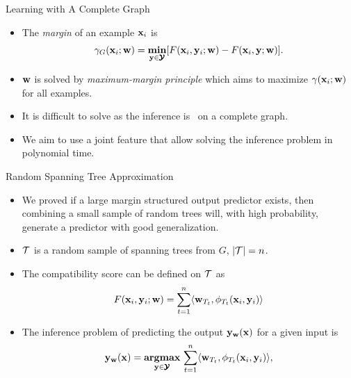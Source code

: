 \documentclass[first=dgreen,second=purple,logo=yellowexc]{aaltoslides}
\begin{document}
%
\begin{frame}{Learning with A Complete Graph}
	\begin{itemize}
		\item The \textit{margin} of an example $\mathbf {x}_i$ is
		\begin{align*}
			\gamma_G(\mathbf {x}_i;\mathbf {w}) = \underset{\mathbf {y}\in\pmb {\mathcal{Y}}}{\textbf{min}}[F(\mathbf {x}_i,\mathbf {y}_i;\mathbf {w})-F(\mathbf {x}_i,\mathbf {y};\mathbf {w})].
		\end{align*}
		\item $\mathbf {w}$ is solved by \textit{maximum-margin principle} which aims to maximize $\gamma(\mathbf {x}_i;\mathbf {w})$ for all examples.
		\item It is difficult to solve as the inference is \nphard\ on a complete graph.
		\item We aim to use a joint feature that allow solving the inference problem in polynomial time.
	\end{itemize}
\end{frame}



%
\begin{frame}{Random Spanning Tree Approximation}
	\begin{itemize}
		\item We proved if a large margin structured output predictor exists, then combining a small sample of random trees will, with high probability, generate a predictor with good generalization.
		\item $\mathcal{T}$ is a random sample of spanning trees from $G$, $|\mathcal{T}| = n$.
		\item The compatibility score can be defined on $\mathcal{T}$ as
		\begin{align*}
			F(\mathbf {x}_i,\mathbf {y}_i;\mathbf {w}) = \sum_{t=1}^{n}\langle \mathbf {w}_{T_t}, \phi_{T_t}(\mathbf {x}_i,\mathbf {y}_i) \rangle
		\end{align*}
		\item The inference problem of predicting the output $\mathbf {y}_{\mathbf {w}}(\mathbf {x})$ for a given input is 
		\begin{align*}
			\mathbf {y}_{\mathbf {w}}(\mathbf {x}) = \underset{\mathbf {y}\in\pmb {\mathcal{Y}}}{\textbf{argmax}}\,\sum_{t=1}^{n}\langle \mathbf {w}_{T_t}, \phi_{T_t}(\mathbf {x}_i,\mathbf {y}_i) \rangle,
		\end{align*}
	\end{itemize}
\end{frame}
\end{document}
